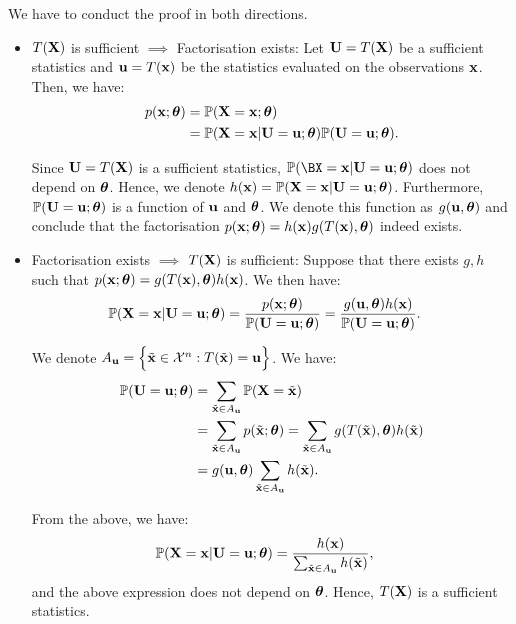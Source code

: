\begin{proof*}
    We have to conduct the proof in both directions.
    \begin{itemize}
        \item $T({\bf X})$ is sufficient $\implies$ Factorisation exists:
        Let ${\bf U}=T({\bf X})$ be a sufficient statistics and ${\bf u} = T({\bf x})$ be the statistics evaluated on the observations ${\bf x}$. Then, we have:
        \begin{align*}
            p({\bf x};\boldsymbol{\theta}) &= \mathbb{P}({\bf X}={\bf x}; \boldsymbol{\theta}) \\ 
                &= \mathbb{P}({\bf X}={\bf x} | {\bf U}={\bf u}; \boldsymbol{\theta}) \mathbb{P}({\bf U}={\bf u};\boldsymbol{\theta}).
        \end{align*} 

        \noindent Since ${\bf U}=T({\bf X})$ is a sufficient statistics, $\Pm(\BX=\bx|\bU=\bu;\btheta)$ does not depend on $\boldsymbol{\theta}$. Hence, we denote $h({\bf x}) = \mathbb{P}({\bf X}={\bf x}|{\bf U}={\bf u};\boldsymbol{\theta})$. Furthermore, $\mathbb{P}({\bf U}={\bf u};\boldsymbol{\theta})$ is a function of ${\bf u}$ and $\boldsymbol{\theta}$. We denote this function as $g({\bf u}, \boldsymbol{\theta})$ and conclude that the factorisation $p({\bf x};\boldsymbol{\theta})=h({\bf x})g(T({\bf x}),\boldsymbol{\theta})$ indeed exists. 

        \item Factorisation exists $\implies$ $T({\bf X})$ is sufficient: Suppose that there exists $g, h$ such that $p({\bf x};\boldsymbol{\theta})=g(T({\bf x}), \boldsymbol{\theta})h({\bf x})$. We then have:
        \begin{align*}
            \mathbb{P}({\bf X} = {\bf x}|{\bf U} = {\bf u};\boldsymbol{\theta}) &=  \frac{p({\bf x};\boldsymbol{\theta})}{\mathbb{P}({\bf U}={\bf u};\boldsymbol{\theta})} = \frac{g({\bf u}, \boldsymbol{\theta})h({\bf x})}{\mathbb{P}({\bf U}={\bf u};\boldsymbol{\theta})}.
        \end{align*} 

        \noindent We denote $A_{\bf u} = \Big\{ \tilde{{\bf x}} \in \mathcal{X}^n : T(\tilde{{\bf x}}) = {\bf u} \Big\}$. We have:
        \begin{align*}
            \mathbb{P}({\bf U} = {\bf u};\boldsymbol{\theta}) &= \sum_{\tilde {{\bf x}} \in A_{\bf u}} \mathbb{P}({\bf X} = \tilde{{\bf x}}) \\ 
                &= \sum_{\tilde{{\bf x}}\in A_{\bf u}} p(\tilde{{\bf x}};\boldsymbol{\theta}) = \sum_{\tilde{{\bf x}}\in A_{\bf u}} g(T(\tilde{{\bf x}}), \boldsymbol{\theta})h(\tilde{{\bf x}}) \\ 
                &= g({\bf u}, \boldsymbol{\theta}) \sum_{\tilde{{\bf x}}\in A_{\bf u}} h(\tilde{{\bf x}}).
        \end{align*} 

        \noindent From the above, we have:
        \begin{align*}
            \mathbb{P}({\bf X}={\bf x}|{\bf U}={\bf u};\boldsymbol{\theta}) &= \frac{h({\bf x})}{\sum_{\tilde{{\bf x}}\in A_{\bf u}} h(\tilde{{\bf x}})},
        \end{align*} 
        \noindent and the above expression does not depend on $\boldsymbol{\theta}$. Hence, $T({\bf X})$ is a sufficient statistics.
    \end{itemize}


\end{proof*}
